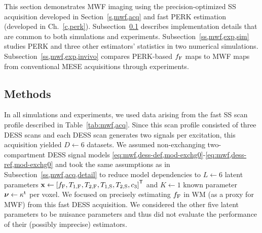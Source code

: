 This section demonstrates MWF imaging
using the precision-optimized SS acquisition
developed in Section~\ref{s,mwf,acq}
and fast PERK estimation
(developed in Ch.~\ref{c,perk}). 
Subsection~\ref{ss,mwf,exp,meth}
describes implementation details
that are common
to both simulations and experiments.
Subsection~\ref{ss,mwf,exp,sim}
studies PERK and three other estimators' statistics
in two numerical simulations.
Subsection~\ref{ss,mwf,exp,invivo}
compares PERK-based $f_{\mathrm{F}}$ maps
to MWF maps 
from conventional MESE acquisitions
through \invivo experiments.

\subsection{Methods}
\label{ss,mwf,exp,meth}

In all simulations and experiments,
we used data arising 
from the fast SS scan profile 
described in Table~\ref{tab:mwf,acq}.
Since this scan profile
consisted of three DESS scans
and each DESS scan 
generates two signals per excitation,
this acquisition yielded $D \gets 6$ datasets.
We assumed non-exchanging two-compartment DESS signal models
\eqref{eq:mwf,dess-def,mod-exchg0}-\eqref{eq:mwf,dess-ref,mod-exchg0}
and took the same assumptions
as in Subsection~\ref{ss,mwf,acq,detail}
to reduce model dependencies
to $L \gets 6$ latent parameters 
$\bmx \gets \brac{\ff,\tf{1},\tf{2},\ts{1},\ts{2},\const{3}}\tpose$
and $K \gets 1$ known parameter 
$\boldsymbol{\nu} \gets \kappa^{\mathrm{t}}$ 
per voxel.
We focused on precisely estimating $f_{\mathrm{F}}$ in WM 
(as a proxy for MWF)
from this fast DESS acquisition.
We considered the other five latent parameters
to be nuisance parameters
and thus did not evaluate the performance 
of their (possibly imprecise) estimators.

